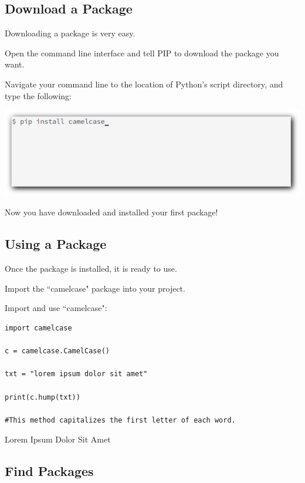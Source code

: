 \documentclass[12pt,a4paper]{article}
\begin{document}
\subsection{Download a Package}

Downloading a package is very easy.

Open the command line interface and tell PIP to download the package you want.

Navigate your command line to the location of Python's script directory, and
type the following:

\begin{center}
	\includegraphics[width=.8\textwidth]{shots/pip-install-package.png}
\end{center}

Now you have downloaded and installed your first package!
\subsection{Using a Package}

Once the package is installed, it is ready to use.

Import the ``camelcase" package into your project.

\begin{ebox}
Import and use ``camelcase":
	\begin{lstlisting}
import camelcase

c = camelcase.CamelCase()

txt = "lorem ipsum dolor sit amet"

print(c.hump(txt))

#This method capitalizes the first letter of each word.
	\end{lstlisting}
\tcblower
	\begin{vercode}
Lorem Ipsum Dolor Sit Amet
	\end{vercode}
\end{ebox}
\subsection{Find Packages}
\end{document}
